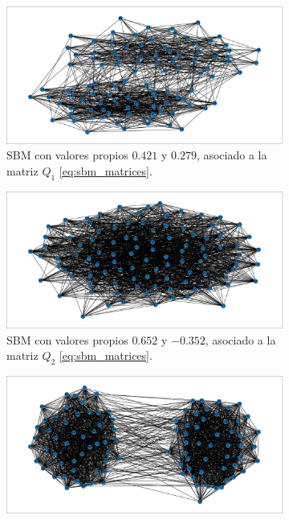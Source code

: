 \documentclass{article}
\begin{document}
\begin{figure}[htb]
    \centering
    \begin{subfigure}{0.49\textwidth}
        \centering
        \includegraphics[width=\linewidth]{images/sbm/n50_0_0.421_0.279.pdf}
        \caption{SBM con valores propios $0.421$ y $0.279$, asociado a la matriz $Q_1$ \eqref{eq:sbm_matrices}.}
        \label{fig:sbm_eigenvalues_reference}
    \end{subfigure}
    \hfill
    \begin{subfigure}{0.49\textwidth}
        \centering
        \includegraphics[width=\linewidth]{images/sbm/n50_1_0.652_-0.352.pdf}
        \caption{SBM con valores propios $0.652$ y $-0.352$, asociado a la matriz $Q_2$ \eqref{eq:sbm_matrices}.}
        \label{fig:sbm_eigenvalues_negative}
    \end{subfigure}
    \par\bigskip
    \begin{subfigure}{0.49\textwidth}
        \centering
        \includegraphics[width=\linewidth]{images/sbm/n50_2_0.85_0.75.pdf}

\end{subfigure}
\end{figure}
\end{document}
